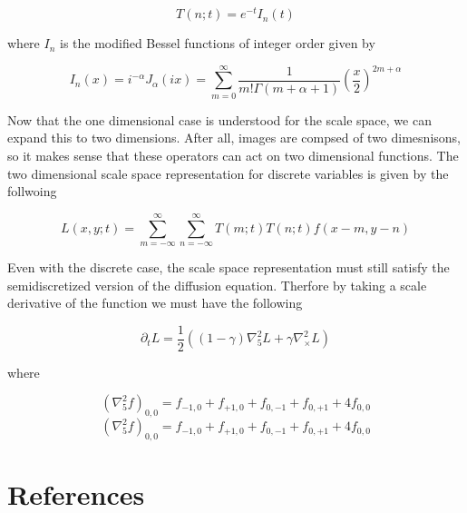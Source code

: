 \documentclass{article}
\begin{document}
    \begin{equation}
        T(n;t) = e^{-t}I_n(t)
    \end{equation} 

    where $I_n$ is the modified Bessel functions of integer order given by 

    \begin{equation}
        I_n(x) = i^{-\alpha}J_{\alpha}(ix) = \sum_{m=0}^{\infty}\frac{1}{m!\Gamma(m+\alpha+1)}\left(\frac{x}{2}\right)^{2m+\alpha}
    \end{equation}

    Now that the one dimensional case is understood for the scale space, we can expand this to two dimensions. After all, images are compsed of two dimesnisons, so it makes sense that these operators can act on two dimensional functions. The two dimensional scale space representation for discrete variables is given by the follwoing

    \begin{equation}
        L(x,y;t) = \sum_{m=-\infty}^{\infty}\sum_{n=-\infty}^{\infty}T(m;t)T(n;t)f(x-m,y-n)
    \end{equation}

    Even with the discrete case, the scale space representation must still satisfy the semidiscretized version of the diffusion equation. Therfore by taking a scale derivative of the function we must have the following

    \begin{equation}
        \partial_t L = \frac{1}{2}((1-\gamma)\nabla^2_5L+\gamma\nabla^2_\times L)
    \end{equation}

    where

    \begin{equation}
        (\nabla^2_5f)_{0,0} = f_{-1,0} + f_{+1,0} + f_{0,-1} + f_{0,+1} + 4f_{0,0}
    \end{equation}
    \begin{equation}
        (\nabla^2_5f)_{0,0} = f_{-1,0} + f_{+1,0} + f_{0,-1} + f_{0,+1} + 4f_{0,0}
    \end{equation}

\section*{References}
\end{document}
